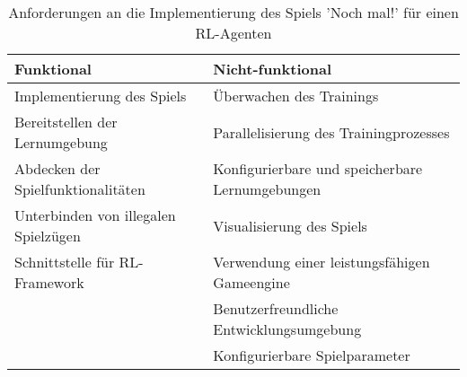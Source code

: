     \begin{table}[h]
        \centering

        \label{tab:requirements}
        \begin{tabular}{|l|p{10cm}|}
        \hline
        \textbf{Funktional} & \textbf{Nicht-funktional} \\
        \hline
        Implementierung des Spiels & Überwachen des Trainings \\
        \hline
        Bereitstellen der Lernumgebung & Parallelisierung des Trainingprozesses \\
        \hline
        Abdecken der Spielfunktionalitäten & Konfigurierbare und speicherbare Lernumgebungen \\
        \hline
        Unterbinden von illegalen Spielzügen & Visualisierung des Spiels \\
        \hline
        Schnittstelle für RL-Framework & Verwendung einer leistungsfähigen Gameengine \\
        \hline
        & Benutzerfreundliche Entwicklungsumgebung \\
        \hline
        & Konfigurierbare Spielparameter \\
        \hline
        \end{tabular}
        \caption{Anforderungen an die Implementierung des Spiels 'Noch mal!' für einen RL-Agenten}
    \end{table}

